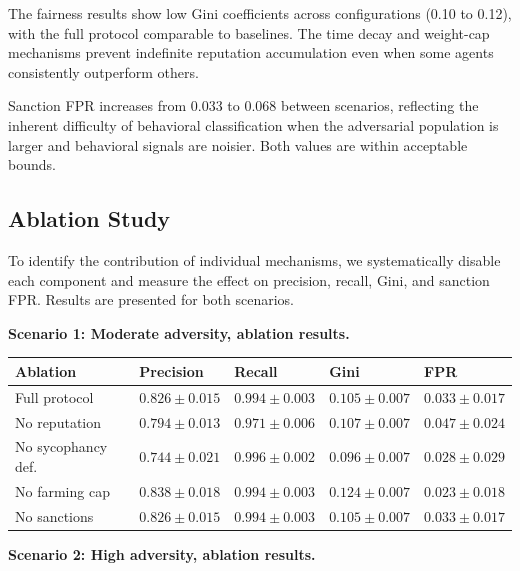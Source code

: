 \documentclass[11pt]{article}
\begin{document}
The fairness results show low Gini coefficients across configurations (0.10 to 0.12), with the full protocol comparable to baselines. The time decay and weight-cap mechanisms prevent indefinite reputation accumulation even when some agents consistently outperform others.

Sanction FPR increases from 0.033 to 0.068 between scenarios, reflecting the inherent difficulty of behavioral classification when the adversarial population is larger and behavioral signals are noisier. Both values are within acceptable bounds.

\subsection{Ablation Study}

To identify the contribution of individual mechanisms, we systematically disable each component and measure the effect on precision, recall, Gini, and sanction FPR. Results are presented for both scenarios.

\textbf{Scenario 1: Moderate adversity, ablation results.}

\begin{table}[h]
\centering
\small
\begin{tabular}{lllll}
\toprule
\textbf{Ablation} & \textbf{Precision} & \textbf{Recall} & \textbf{Gini} & \textbf{FPR} \\
\midrule
Full protocol & $0.826 \pm 0.015$ & $0.994 \pm 0.003$ & $0.105 \pm 0.007$ & $0.033 \pm 0.017$ \\
No reputation & $0.794 \pm 0.013$ & $0.971 \pm 0.006$ & $0.107 \pm 0.007$ & $0.047 \pm 0.024$ \\
No sycophancy def. & $0.744 \pm 0.021$ & $0.996 \pm 0.002$ & $0.096 \pm 0.007$ & $0.028 \pm 0.029$ \\
No farming cap & $0.838 \pm 0.018$ & $0.994 \pm 0.003$ & $0.124 \pm 0.007$ & $0.023 \pm 0.018$ \\
No sanctions & $0.826 \pm 0.015$ & $0.994 \pm 0.003$ & $0.105 \pm 0.007$ & $0.033 \pm 0.017$ \\
\bottomrule
\end{tabular}
\end{table}

\textbf{Scenario 2: High adversity, ablation results.}
\end{document}
